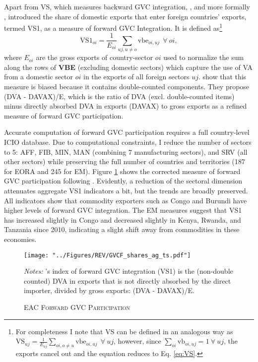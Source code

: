 \documentclass[a4paper]{article}
\begin{document}
Apart from VS, which measures backward GVC integration, \citet{hummels2001nature}, and more formally \citet{daudin2011produces}, introduced the share of domestic exports that enter foreign countries' exports, termed VS1, as a measure of forward GVC Integration. It is defined as\footnote{For completeness I note that VS can be defined in an analogous way as $\text{VS}_{uj} = \frac{1}{E_{uj}} \sum_{oi, o \neq  u} \text{vbe}_{oi, uj}\ \ \forall\ uj$, however, since $\sum_{oi} \text{vb}_{oi, uj} = 1\ \forall\ uj$, the exports cancel out and the equation reduces to Eq. \ref{eq:VS}. \vspace{-4mm}}
%
\begin{equation} \label{eq:VS1}
\text{VS1}_{oi} = \frac{1}{E_{oi}} \sum_{uj, u \neq  o} \text{vbe}_{oi, uj}\ \ \forall\ oi,
\end{equation}
%
\noindent where $E_{oi}$ are the gross exports of country-sector $oi$ used to normalize the sum along the rows of \textbf{VBE} (excluding domestic sectors) which capture the use of VA from a domestic sector $oi$ in the exports of all foreign sectors $uj$. \citet{borin2019measuring} show that this measure is biased because it contains double-counted components. They propose (DVA - DAVAX)/E, which is the ratio of DVA (excl. double-counted items) minus directly absorbed DVA in exports (DAVAX) to gross exports as a refined measure of forward GVC participation. \newline 

Accurate computation of forward GVC participation requires a full country-level ICIO database. Due to computational constraints, I reduce the number of sectors to 5: AFF, FIB, MIN, MAN (combining 7 manufacturing sectors), and SRV (all other sectors) while preserving the full number of countries and territories (187 for EORA and 245 for EM). Figure \ref{fig:EAC_E2R_ag_ts} shows the corrected measure of forward GVC participation following \citet{borin2019measuring}. Evidently, a reduction of the sectoral dimension attenuates aggregate VS1 indicators a bit, but the trends are broadly preserved. All indicators show that commodity exporters such as Congo and Burundi have higher levels of forward GVC integration. The EM measures suggest that VS1 has increased slightly in Congo and decreased slightly in Kenya, Rwanda, and Tanzania since 2010, indicating a slight shift away from commodities in these economies. 

\begin{figure}[h!] 
\centering
\caption{\label{fig:EAC_E2R_ag_ts}\textsc{EAC Forward GVC Participation}}
\texttt{[image: "../Figures/REV/GVCF\_shares\_ag\_ts.pdf"]} \\ \raggedright
\scriptsize
\emph{Notes:} \citet{borin2019measuring}'s index of forward GVC integration (VS1) is the (non-double counted) DVA in exports that is not directly absorbed by the direct importer, divided by gross exports: (DVA - DAVAX)/E. 
\end{figure}
\FloatBarrier
\end{document}
